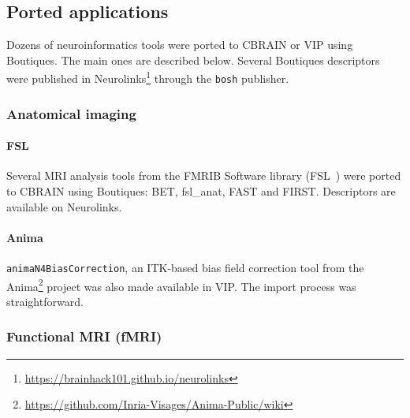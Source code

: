 \documentclass[a4paper,num-refs]{oup-contemporary}
\newcommand{\todo}[1]{\color{red}TODO: #1\color{black}}
\newcommand{\boutiques}{Boutiques\xspace}
\begin{document}
\subsection{Ported applications}



Dozens of neuroinformatics tools were ported to CBRAIN or VIP using
\boutiques. The main ones are described below. Several \boutiques
descriptors were published in
Neurolinks\footnote{\url{https://brainhack101.github.io/neurolinks}}
through the \texttt{bosh} publisher.




\subsubsection{Anatomical imaging}

\paragraph{FSL} Several MRI analysis tools from the FMRIB Software
library (FSL~\cite{jenkinson2012fsl}) were ported to CBRAIN using
\boutiques: BET, fsl\_anat, FAST and FIRST. Descriptors are available
on Neurolinks.

\paragraph{Anima}
\texttt{animaN4BiasCorrection}, an ITK-based bias field correction tool from the
Anima\footnote{\url{https://github.com/Inria-Visages/Anima-Public/wiki}}
project was also made available in VIP. The import process was
straightforward.

\subsubsection{Functional MRI (fMRI)}
\end{document}
